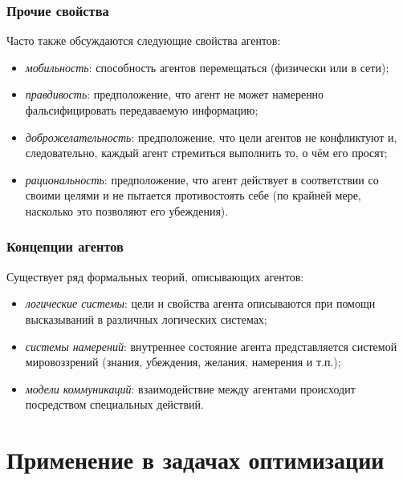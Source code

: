 \documentclass{beamer}
\begin{document}
\begin{frame}
  \frametitle{Прочие свойства}
  Часто также обсуждаются следующие свойства агентов:

  \begin{itemize}
    \item {\it мобильность}: способность агентов перемещаться (физически или в сети);
    \item {\it правдивость}: предположение, что агент не может намеренно фальсифицировать передаваемую информацию;
    \item {\it доброжелательность}: предположение, что цели агентов не конфликтуют и, следовательно, каждый агент
      стремиться выполнить то, о чём его просят;
    \item {\it рациональность}: предположение, что агент действует в соответствии со своими целями и не пытается
      противостоять себе (по крайней мере, насколько это позволяют его убеждения).
  \end{itemize}
\end{frame}

\begin{frame}
  \frametitle{Концепции агентов}
  Существует ряд формальных теорий, описывающих агентов:

  \begin{itemize}
    \item {\it логические системы}:
      цели и свойства агента описываются при помощи высказываний
      в различных логических системах;
    \item {\it системы намерений}:
      внутреннее состояние агента представляется системой
      мировоззрений (знания, убеждения, желания, намерения и т.п.);
    \item {\it модели коммуникаций}:
      взаимодействие между агентами происходит посредством специальных
      действий.
  \end{itemize}
\end{frame}

\section{Применение в задачах оптимизации}
\end{document}
